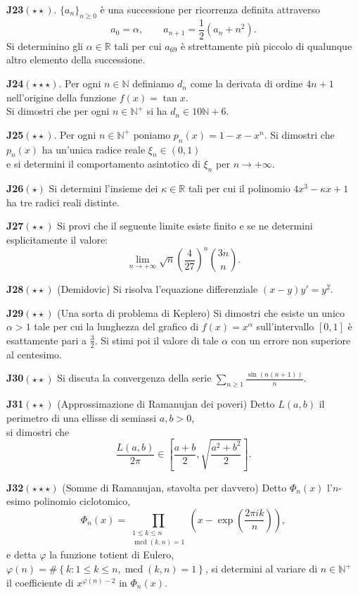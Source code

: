 \documentclass[a4paper,twoside]{article}
\renewcommand{\gcd}{\operatorname{mcd}}
\theoremstyle{definition}
\numberwithin{theorem}{section}
\begin{document}
\textbf{J23}$(\star\star)$. $\{a_n\}_{n\geq 0}$ è una successione per ricorrenza definita attraverso
$$ a_0=\alpha,\qquad a_{n+1} = \frac{1}{2}\left(a_n+n^2\right).$$
Si determinino gli $\alpha\in\mathbb{R}$ tali per cui $a_{69}$ è strettamente più piccolo di qualunque altro elemento della successione. 

\textbf{J24}$(\star\star\star)$. Per ogni $n\in\mathbb{N}$ definiamo $d_n$ come la derivata di ordine $4n+1$ nell'origine della funzione $f(x)=\tan x$.\\ Si dimostri che per ogni $n\in\mathbb{N}^+$ si ha $d_n \in 10\mathbb{N}+6$.

\textbf{J25}$(\star\star)$. Per ogni $n\in\mathbb{N}^+$ poniamo $p_n(x)=1-x-x^n$. Si dimostri che $p_n(x)$ ha un'unica radice reale $\xi_n\in (0,1)$\\ e si determini il comportamento asintotico di $\xi_n$ per $n\to +\infty$. 

\textbf{J26}$(\star)$ Si determini l'insieme dei $\kappa\in\mathbb{R}$ tali per cui il polinomio $4x^3-\kappa x+1$ ha tre radici reali distinte.

\textbf{J27}$(\star\star)$ Si provi che il seguente limite esiste finito e se ne determini esplicitamente il valore:
$$ \lim_{n\to +\infty} \sqrt{n}\left(\frac{4}{27}\right)^n \binom{3n}{n}. $$

\textbf{J28}$(\star\star)$ (Demidovic) Si risolva l'equazione differenziale $(x-y)y'=y^2$.

\textbf{J29}$(\star\star)$ (Una sorta di problema di Keplero) Si dimostri che esiste un unico $\alpha > 1$ tale per cui la lunghezza del grafico di $f(x)=x^{\alpha}$ sull'intervallo $[0,1]$ è esattamente pari a $\frac{3}{2}$. Si stimi poi il valore di tale $\alpha$ con un errore non superiore al centesimo.

\textbf{J30}$(\star\star)$ Si discuta la convergenza della serie $\sum_{n\geq 1}\frac{\sin(n(n+1))}{n}$. 

\textbf{J31}$(\star\star)$ (Approssimazione di Ramanujan dei poveri) Detto $L(a,b)$ il perimetro di una ellisse di semiassi $a,b > 0$,\\ si dimostri che 
$$ \frac{L(a,b)}{2\pi}\in\left[\frac{a+b}{2},\sqrt{\frac{a^2+b^2}{2}}\right]. $$

\textbf{J32}$(\star\star\star)$ (Somme di Ramanujan, stavolta per davvero) Detto $\Phi_n(x)$ l'$n$-esimo polinomio ciclotomico, 
$$\Phi_n(x) = \prod_{\substack{1\leq k\leq n\\\gcd(k,n)=1}}\left(x-\exp\left(\frac{2\pi i k}{n}\right)\right),$$ e detta $\varphi$ la funzione totient di Eulero, $\varphi(n)=\#\left\{k:1\leq k\leq n, \gcd(k,n)=1\right\}$, si determini al variare di $n\in\mathbb{N}^+$\\ il coefficiente di $x^{\varphi(n)-2}$ in $\Phi_n(x)$.
\end{document}
